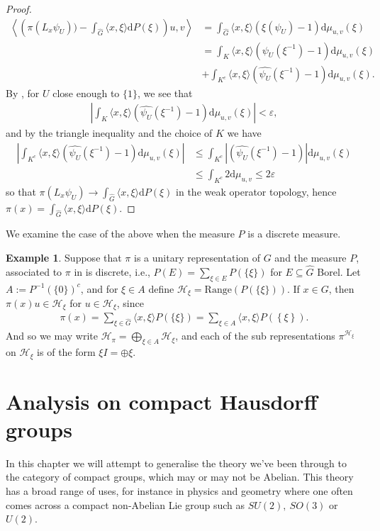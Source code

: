 \documentclass[10pt,twoside,openany,final]{memoir}
\theoremstyle{definition}
\theoremstyle{Break}
\newtheorem{example}[theorem]{Example}
\newcommand{\G}{\widehat{G}}
\renewcommand{\H}{\mathcal{H}}
\renewcommand{\d}{\mathrm{d}}
\begin{document}
\begin{proof}
	\begin{align*}
		\left\langle \left( \pi(L_x \psi_U)) - \int_{\G} \langle x , \xi \rangle \d P(\xi) \right)u,v  \right\rangle &=\int_{\G}\langle x,\xi\rangle (\xi(\psi_U)-1) \d \mu_{u,v}(\xi)\\
		&= \int_K \langle x , \xi \rangle (\widehat{\psi_U}(\xi^{-1}) - 1 ) \d \mu_{u,v}(\xi)\\
		&+\int_{K^c} \langle x , \xi \rangle (\widehat{\psi_U}(\xi^{-1})-1) \d \mu_{u,v}(\xi).
	\end{align*}
	By , for $U$ close enough to $\{1\}$, we see that
	\begin{align*}
	\left| \int_K \langle x , \xi \rangle (\widehat{\psi_U}(\xi^{-1}) - 1 ) \d \mu_{u,v}(\xi)\right| < \varepsilon,	
	\end{align*}
	and by the triangle inequality and the choice of $K$ we have
	\begin{align*}
		\left|\int_{K^c} \langle x , \xi \rangle (\widehat{\psi_U}(\xi^{-1})-1) \d \mu_{u,v}(\xi)\right|&\leq \int_{K^c}|(\widehat{\psi_U}(\xi^{-1})-1)| \d \mu_{u,v}(\xi)\\
		&\leq\int_{K^c} 2 \d \mu_{u,v}\leq 2\varepsilon
	\end{align*}
	so that $\pi(L_x \psi_U) \to \int_{\G}\langle x, \xi\rangle \d P(\xi)$ in the weak operator topology, hence $\pi(x) = \int_{\G} \langle x , \xi \rangle \d P(\xi)$.
\end{proof}
We examine the case of the above when the measure $P$ is a discrete measure.
\begin{example}
	Suppose that $\pi$ is a unitary representation of $G$ and the measure $P$, associated to $\pi$ in  is discrete, i.e., $P(E)=\sum_{\xi \in E}P(\{\xi\})$ for $E\subseteq \G$ Borel. Let $A:=P^{-1}(\{0\})^c$, and for $\xi \in A$ define $\H_\xi=\mathrm{Range}(P(\{\xi\}))$. If $x \in G$, then $\pi(x)u \in \H_\xi$ for $u \in \H_\xi$, since 
	\begin{align*}
		\pi(x)=\sum_{\xi \in \G} \langle x , \xi \rangle P(\{\xi\}) = \sum_{\xi \in A}\langle x , \xi \rangle P(\left\{ \xi \right\}).
	\end{align*}
	And so we may write $\H_\pi=\bigoplus_{\xi \in A} \H_\xi$, and each of the sub representations $\pi^{\H_\xi}$ on $\H_\xi$ is of the form $\xi I=\oplus \xi$.
\end{example}

\chapter{Analysis on compact Hausdorff groups}
In this chapter we will attempt to generalise the theory we've been through to the category of compact groups, which may or may not be Abelian. This theory has a broad range of uses, for instance in physics and geometry where one often comes across a compact non-Abelian Lie group such as $SU(2), \ SO(3)$ or $U(2)$.
\end{document}
